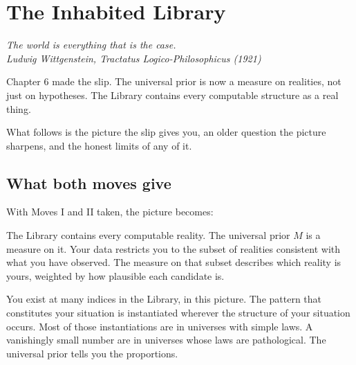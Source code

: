 \chapter{The Inhabited Library}

\vspace{1em}
\hfill
\begin{minipage}[c]{0.55\textwidth}
\raggedleft
\small\itshape
The world is everything that is the case.\\[0.5em]
\upshape\footnotesize Ludwig Wittgenstein, \textit{Tractatus Logico-Philosophicus} (1921)
\end{minipage}%
\hspace{0.5em}
\begin{minipage}[c]{0.12\textwidth}
\end{minipage}
\vspace{1.5em}

\noindent Chapter 6 made the slip. The universal prior is now a measure on realities, not just on hypotheses. The Library contains every computable structure as a real thing.

What follows is the picture the slip gives you, an older question the picture sharpens, and the honest limits of any of it.

\section*{What both moves give}

With Moves I and II taken, the picture becomes:

The Library contains every computable reality. The universal prior $M$ is a measure on it. Your data restricts you to the subset of realities consistent with what you have observed. The measure on that subset describes which reality is yours, weighted by how plausible each candidate is.

You exist at many indices in the Library, in this picture. The pattern that constitutes your situation is instantiated wherever the structure of your situation occurs. Most of those instantiations are in universes with simple laws. A vanishingly small number are in universes whose laws are pathological. The universal prior tells you the proportions.

